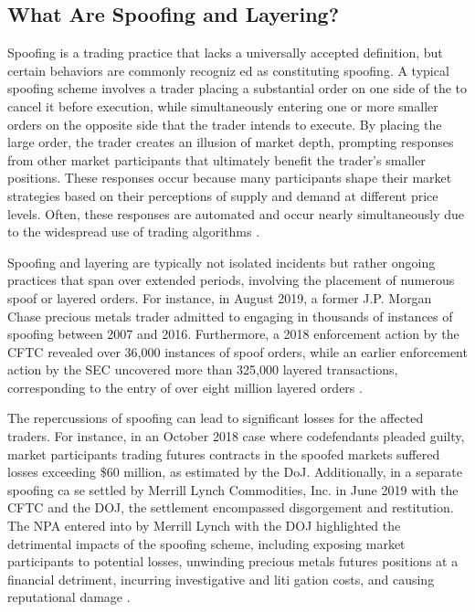 \subsection{What Are Spoofing and Layering?}
Spoofing is a trading practice that lacks a universally accepted definition, but certain behaviors are commonly recogniz
ed as constituting spoofing. A typical spoofing scheme involves a trader placing a substantial order on one side of the
to cancel it before execution, while simultaneously entering one or more smaller orders on the opposite side that the trader
intends to execute. By placing the large order, the trader creates an illusion of market depth, prompting responses from
other market participants that ultimately benefit the trader's smaller positions. These responses occur because many participants
shape their market strategies based on their perceptions of supply and demand at different price levels. Often, these
responses are automated and occur nearly simultaneously due to the widespread use of trading algorithms
\cite{corwin2012large, jarrow2011manipulation}.

Spoofing and layering are typically not isolated incidents but rather ongoing practices that span over extended periods,
involving the placement of numerous spoof or layered orders. For instance, in August 2019, a former J.P. Morgan Chase
precious metals trader admitted to engaging in thousands of instances of spoofing between 2007 and 2016. Furthermore, a
2018 enforcement action by the CFTC revealed over 36,000 instances of spoof orders,
while an earlier enforcement action by the SEC uncovered more than 325,000 layered
transactions, corresponding to the entry of over eight million layered orders \cite{cftc2018spoofing, sec2015spoofing}.

The repercussions of spoofing can lead to significant losses for the affected traders. For instance, in an October 2018
case where codefendants pleaded guilty, market participants trading futures contracts in the spoofed markets suffered
losses exceeding \$60 million, as estimated by the DoJ. Additionally, in a separate spoofing ca
se settled by Merrill Lynch Commodities, Inc. in June 2019 with the CFTC and the
DOJ, the settlement encompassed disgorgement and restitution. The NPA entered into by Merrill
Lynch with the DOJ highlighted the detrimental impacts of the spoofing scheme, including exposing market participants to
potential losses, unwinding precious metals futures positions at a financial detriment, incurring investigative and liti
gation costs, and causing reputational damage \cite{doj2018spoofing, cftc2019merrill}.

